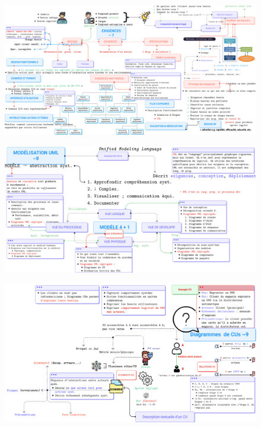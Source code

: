 \documentclass[16pt]{report}
\begin{document}
        \begin{figure}
        \begin{center}
            \includegraphics[width=1.0\textwidth, height=0.7\textwidth]{IFT2255Chapitre7.png}
        \end{center}
        \end{figure}


        \begin{figure}[H]
            \begin{center}
                \includegraphics[width=1.02\textwidth]{IFT2255Chapitre8.png}
            \end{center}
        \end{figure}

        
        \begin{figure}[H]
            \begin{center}
                \includegraphics[width=1.02\textwidth]{IFT2255Chapitre9.png}
            \end{center}
        \end{figure}
\end{document}
